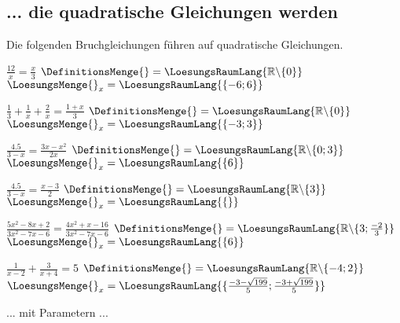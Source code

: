 \platzFuerBerechnungenBisEndeSeite{}

\subsection{... die quadratische Gleichungen werden}
Die folgenden Bruchgleichungen führen auf quadratische Gleichungen.


\begin{bbwAufgabenBlock}
\item $\frac{12}x = \frac{x}3$ \hspace{10mm}   $\DefinitionsMenge{}= \LoesungsRaumLang{\mathbb{R}\backslash\{0\}}$  $\LoesungsMenge{}_x = \LoesungsRaumLang{\{-6; 6\}}$
\item $\frac13 + \frac1x + \frac2x = \frac{1+x}3$ \hspace{10mm}   $\DefinitionsMenge{}= \LoesungsRaumLang{\mathbb{R}\backslash\{0\}}$  $\LoesungsMenge{}_x = \LoesungsRaumLang{\{-3; 3\}}$
\item $\frac{4.5}{3-x} = \frac{3x-x^2}{2x}$ \hspace{10mm}   $\DefinitionsMenge{}= \LoesungsRaumLang{\mathbb{R}\backslash\{0;3\}}$  $\LoesungsMenge{}_x = \LoesungsRaumLang{\{6\}}$\noTRAINER{\newpage}
\item $\frac{4.5}{3-x} = \frac{x-3}{2}$ \hspace{10mm}   $\DefinitionsMenge{}= \LoesungsRaumLang{\mathbb{R}\backslash\{3\}}$  $\LoesungsMenge{}_x = \LoesungsRaumLang{\{\}}$
\item $\frac{5x^2-8x+2}{3x^2-7x-6}=\frac{4x^2+x-16}{3x^2-7x-6}$ \hspace{10mm}   $\DefinitionsMenge{}= \LoesungsRaumLang{\mathbb{R}\backslash\{3;\frac{-2}3\}}$  $\LoesungsMenge{}_x = \LoesungsRaumLang{\{6\}}$
\item $\frac1{x-2} + \frac3{x+4} = 5$ \hspace{10mm}         $\DefinitionsMenge{}= \LoesungsRaumLang{\mathbb{R}\backslash\{-4;2\}}$          $\LoesungsMenge{}_x = \LoesungsRaumLang{\{\frac{-3-\sqrt{199}}{5};\frac{-3+\sqrt{199}}{5} \}}$

\end{bbwAufgabenBlock}

\platzFuerBerechnungenBisEndeSeite{}



... mit Parametern ...


